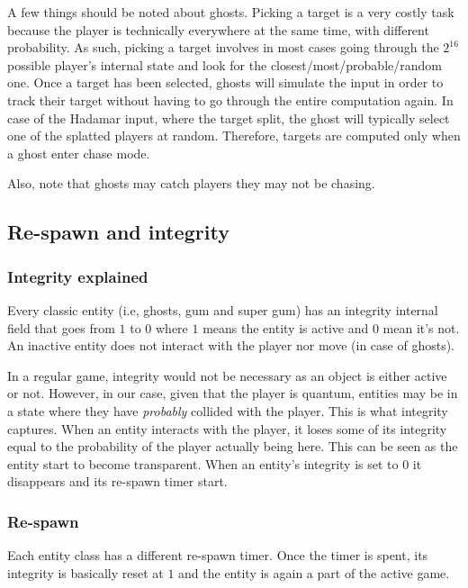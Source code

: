 \documentclass[a4paper]{article}
\begin{document}
A few things should be noted about ghosts. Picking a target is a very costly task because the player is technically everywhere at the same time, with different probability. 
As such, picking a target involves in most cases going through the $2^16$ possible player’s internal state and look for the closest/most/probable/random one. 
Once a target has been selected, ghosts will simulate the input in order to track their target without having to go through the entire computation again. 
In case of the Hadamar input, where the target split, the ghost will typically select one of the splatted players at random. 
Therefore, targets are computed only when a ghost enter chase mode.

Also, note that ghosts may catch players they may not be chasing. 

\subsection{Re-spawn and integrity}

\subsubsection{Integrity explained}

Every classic entity (i.e, ghosts, gum and super gum) has an integrity internal field that goes from $1$ to $0$ where $1$ means the entity is active and $0$ mean it’s not. 
An inactive entity does not interact with the player nor move (in case of ghosts). 

In a regular game, integrity would not be necessary as an object is either active or not. 
However, in our case, given that the player is quantum, entities may be in a state where they have \emph{probably} collided with the player. 
This is what integrity captures. When an entity interacts with the player, it loses some of its integrity equal to the probability of the player actually being here. 
This can be seen as the entity start to become transparent.
When an entity’s integrity is set to $0$ it disappears and its re-spawn timer start. 

\subsubsection{Re-spawn}

Each entity class has a different re-spawn timer. Once the timer is spent, its integrity is basically reset at $1$ and the entity is again a part of the active game.




\end{document}
